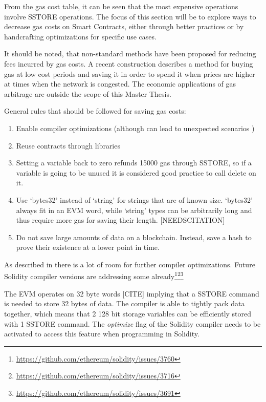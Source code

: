 From the gas cost table, it can be seen that the most expensive operations involve SSTORE operations. The focus of this section will be to explore ways to decrease gas costs on Smart Contracts, either through better practices or by handcrafting optimizations for specific use cases.

It should be noted, that non-standard methods have been proposed for reducing fees incurred by gas costs. A recent construction\cite{gastoken} describes a method for buying gas at low cost periods and saving it in order to spend it when prices are higher at times when the network is congested. The economic applications of gas arbitrage are outside the scope of this Master Thesis. 

General rules that should be followed for saving gas costs:
\begin{enumerate}
    \item Enable compiler optimizations (although can lead to unexpected scenarios \cite{compiler})
    \item Reuse contracts through libraries\cite{library}
    \item Setting a variable back to zero refunds 15000 gas through SSTORE, so if a variable is going to be unused it is considered good practice to call delete on it. 
    \item Use `bytes32' instead of `string' for strings that are of known size. `bytes32' always fit in an EVM word, while `string' types can be arbitrarily long and thus require more gas for saving their length. [NEEDSCITATION]
    \item Do not save large amounts of data on a blockchain. Instead, save a hash to prove their existence at a lower point in time.
\end{enumerate}

As described in \cite{DBLP:journals/corr/ChenLLZ17} there is a lot of room for further compiler optimizations. Future Solidity compiler versions are addressing some already\footnote{\url{https://github.com/ethereum/solidity/issues/3760}}\footnote{\url{https://github.com/ethereum/solidity/issues/3716}}\footnote{\url{https://github.com/ethereum/solidity/issues/3691}}

The EVM operates on 32 byte words [CITE] implying that a SSTORE command is needed to store 32 bytes of data. The compiler is able to tightly pack data together, which means that 2 128 bit storage variables can be efficiently stored with 1 SSTORE command. The \textit{optimize} flag of the Solidity compiler needs to be activated to access this feature when programming in Solidity.

